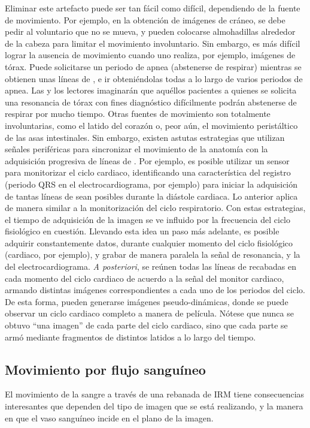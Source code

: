 Eliminar este artefacto puede ser tan fácil como difícil, dependiendo de la fuente de movimiento. Por ejemplo, en la obtención de imágenes de cráneo, se debe pedir al voluntario que no se mueva, y pueden colocarse almohadillas alrededor de la cabeza para limitar el movimiento involuntario. Sin embargo, es más difícil lograr la ausencia de movimiento cuando uno realiza, por ejemplo, imágenes de tórax. Puede solicitarse un periodo de apnea (abstenerse de respirar) mientras se obtienen unas líneas de \espaciok, e ir obteniéndolas todas a lo largo de varios periodos de apnea. Las y los lectores imaginarán que aquéllos pacientes a quienes se solicita una resonancia de tórax con fines diagnóstico difícilmente podrán abstenerse de respirar por mucho tiempo. Otras fuentes de movimiento son totalmente involuntarias, como el latido del corazón o, peor aún, el movimiento peristáltico de las asas intestinales. Sin embargo, existen astutas estrategias que utilizan señales periféricas para sincronizar el movimiento de la anatomía con la adquisición progresiva de líneas de \espaciok. Por ejemplo, es posible utilizar un sensor para monitorizar el ciclo  cardiaco, identificando una característica del registro (periodo QRS en el electrocardiograma, por ejemplo) para iniciar la adquisición de tantas líneas de \espaciok sean posibles durante la diástole cardiaca. Lo anterior aplica de manera similar a la monitorización del ciclo respiratorio. Con estas estrategias, el tiempo de adquisición de la imagen se ve influido por la frecuencia del ciclo fisiológico en cuestión. Llevando esta idea un paso más adelante, es posible adquirir constantemente datos, durante cualquier momento del ciclo fisiológico (cardiaco, por ejemplo), y grabar de manera paralela la señal de resonancia, y la del electrocardiograma. \textit{A posteriori}, se reúnen todas las líneas de \espaciok recabadas en cada momento del ciclo cardiaco de acuerdo a la señal del monitor cardiaco, armando distintas imágenes correspondientes a cada uno de los periodos del ciclo. De esta forma, pueden generarse imágenes pseudo-dinámicas, donde se puede observar un ciclo cardiaco completo a manera de película. Nótese que nunca se obtuvo ``una imagen'' de cada parte del ciclo cardiaco, sino que cada parte se armó mediante fragmentos de distintos latidos a lo largo del tiempo.

\subsection{Movimiento por flujo sanguíneo}
El movimiento de la sangre a través de una rebanada de IRM tiene consecuencias interesantes que dependen del tipo de imagen que se está realizando, y la manera en que el vaso sanguíneo incide en el plano de la imagen. 

